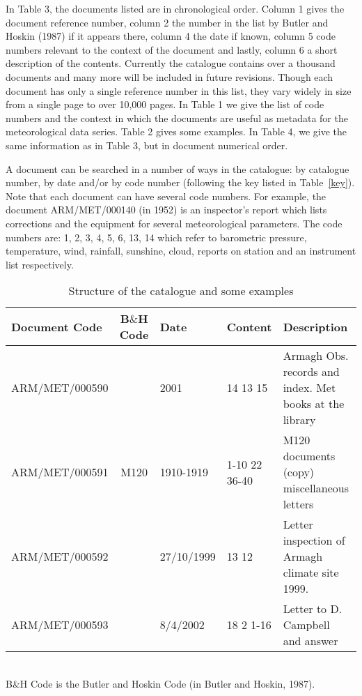 \documentclass[12pt, epsfig, graphics, rotating, epsf,tifff]{article}
\begin{document}
\medskip


In  Table 3, the documents listed are in chronological order. Column 1 gives the document
reference number, column 2 the number in the list by Butler and Hoskin (1987)
if it appears there, column 4 the date if known, column 5 code numbers relevant
to the context of the document and lastly, column 6 a short description of the
contents. Currently the catalogue contains over a thousand documents and many
more will be included in future revisions. Though each document has only a
single reference number in this list, they vary widely in size from a single
page to over 10,000 pages. In Table 1 we give the list of code numbers and the
context in which the documents are useful as metadata for the meteorological
data series. Table 2 gives some examples. In Table 4, we give the same
information as in Table 3, but in document numerical order.

\medskip

 A document can be searched in a number of ways in the catalogue: by  catalogue
 number, by date and/or by code number (following the key listed in
 Table~\ref{key}).  Note that each document can have several code numbers. For
 example, the document  ARM/MET/000140	(in 1952) is an inspector's report
 which lists corrections and the  equipment for several meteorological
 parameters. The code numbers are: 1, 2, 3, 4, 5, 6, 13, 14 which refer to
 barometric pressure, temperature, wind, rainfall, sunshine, cloud,  reports on
 station and an instrument list respectively.





\singlespace
\begin{table}[h!]
\vspace{-0.3cm}       \caption[ ]
{\footnotesize{Structure of the catalogue and some examples}}
\label{sample}
\begin{center} 
\vspace{-0.7cm}\scriptsize{

\begin{tabular}{|@{  }l@{  }|@{  }c@{  }|@{  }l@{  }|@{  }l@{  }|@{  }l@{  }|}
\hline
Document Code & B$\&$H Code &  Date &	   Content&		   Description\\

\hline
ARM/MET/000590 &      &      2001  &          14 13 15     &       Armagh Obs. records and index. Met books at the library\\
ARM/MET/000591 & M120 &      1910-1919 &      1-10 22 36-40  &     M120 documents (copy) miscellaneous letters\\
ARM/MET/000592&		&   27/10/1999&	   13 12	&	   Letter inspection of Armagh climate site 1999.\\
ARM/MET/000593 &      &      8/4/2002	&   18 2 1-16	&	   Letter to D. Campbell and answer\\

\hline
   \end{tabular}
}\\B$\&$H Code is the Butler and Hoskin Code (in Butler and Hoskin, 1987).
\end{center}
\end{table}			
\end{document}
